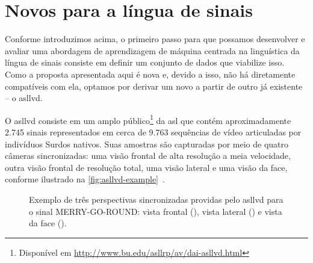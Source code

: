 \section{Novos \datasets para a língua de sinais}
\label{sec:metodologia-datasets}

Conforme introduzimos acima, o primeiro passo para que possamos desenvolver e avaliar uma abordagem de aprendizagem de máquina centrada na linguística da língua de sinais consiste em definir um conjunto de dados que viabilize isso. Como a proposta apresentada aqui é nova e, devido a isso, não há \datasets diretamente compatíveis com ela, optamos por derivar um novo \dataset a partir de outro já existente -- o \acrfull{asllvd}.

O \acrshort{asllvd} consiste em um amplo \dataset público\footnote{Disponível em \url{http://www.bu.edu/asllrp/av/dai-asllvd.html}} da \acrshort{asl} que contém aproximadamente 2.745 sinais representados em cerca de 9.763 sequências de vídeo articuladas por indivíduos Surdos nativos. Suas amostras são capturadas por meio de quatro câmeras sincronizadas: uma visão frontal de alta resolução a meia velocidade, outra visão frontal de resolução total, uma visão lateral e uma visão da face, conforme ilustrado na \autoref{fig:asllvd-example}~\cite{athitsos-2008-asllvd,neidle-2012-asllvd}.

\begin{figure}[ht!]
    \centering
    \caption{\textmd{Exemplo de três perspectivas sincronizadas providas pelo \acrshort{asllvd} para o sinal MERRY-GO-ROUND: 
    vista frontal (), 
    vista lateral () e 
    vista da face ().}}
    \hfill
    \hfill
    \label{fig:asllvd-example}
\end{figure}


